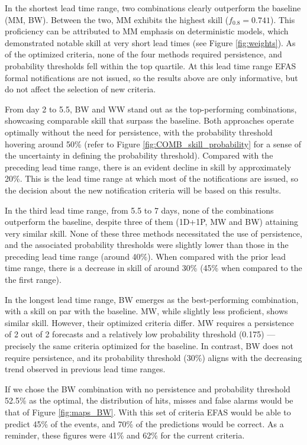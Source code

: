 \documentclass[preprint,12pt]{elsarticle}
\begin{document}
In the shortest lead time range, two combinations clearly outperform the baseline (MM, BW). Between the two, MM exhibits the highest skill ($f_{0.8}=0.741$). This proficiency can be attributed to MM emphasis on deterministic models, which demonstrated notable skill at very short lead times (see Figure \ref{fig:weights}). As of the optimized criteria, none of the four methods required persistence, and probability thresholds fell within the top quartile. At this lead time range EFAS formal notifications are not issued, so the results above are only informative, but do not affect the selection of new criteria.

From day 2 to 5.5, BW and WW stand out as the top-performing combinations, showcasing comparable skill that surpass the baseline. Both approaches operate optimally without the need for persistence, with the probability threshold hovering around 50\% (refer to Figure \ref{fig:COMB_skill_probability} for a sense of the uncertainty in defining the probability threshold). Compared with the preceding lead time range, there is an evident decline in skill by approximately 20\%. This is the lead time range at which most of the notifications are issued, so the decision about the new notification criteria will be based on this results.

In the third lead time range, from 5.5 to 7 days, none of the combinations outperform the baseline, despite three of them (1D+1P, MW and BW) attaining very similar skill. None of these three methods necessitated the use of persistence, and the associated probability thresholds were slightly lower than those in the preceding lead time range (around 40\%). When compared with the prior lead time range, there is a decrease in skill of around 30\% (45\% when compared to the the first range).

In the longest lead time range, BW emerges as the best-performing combination, with a skill on par with the baseline. MW, while slightly less proficient, shows similar skill. However, their optimized criteria differ. MW requires a persistence of 2 out of 2 forecasts and a relatively low probability threshold (0.175) — precisely the same criteria optimized for the baseline. In contrast, BW does not require persistence, and its probability threshold (30\%) aligns with the decreasing trend observed in previous lead time ranges.

If we chose the BW combination with no persistence and probability threshold 52.5\% as the optimal, the distribution of hits, misses and false alarms would be that of Figure \ref{fig:maps_BW}. With this set of criteria EFAS would be able to predict 45\% of the events, and 70\% of the predictions would be correct. As a reminder, these figures were 41\% and 62\% for the current criteria.
\end{document}
